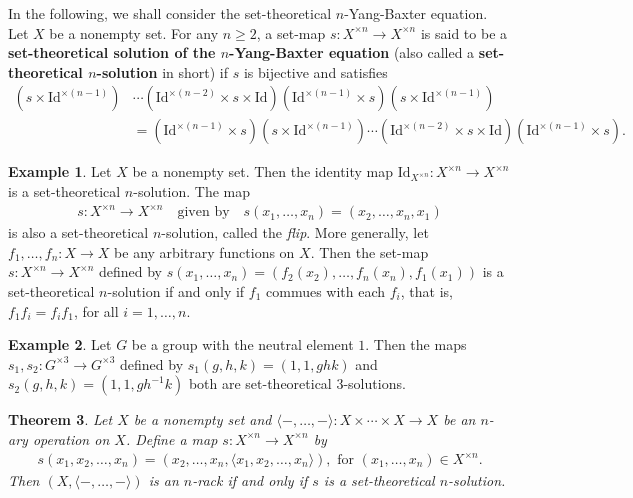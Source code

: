 \documentclass[a4paper,reqno,10pt]{amsart}
\theoremstyle{plain}
\newtheorem{thm}{Theorem}[section]
\theoremstyle{definition}
\newtheorem{exam}[thm]{Example}
\theoremstyle{remark}
\begin{document}
\medskip



In the following, we shall consider the set-theoretical $n$-Yang-Baxter equation. Let $X$ be a nonempty set. For any $n \geq 2$, a set-map $s : X^{\times n} \rightarrow X^{\times n}$ is said to be a {\bf set-theoretical solution of the $n$-Yang-Baxter equation} (also called a {\bf set-theoretical $n$-solution} in short) if $s$ is bijective and satisfies
\begin{align}\label{set-nybe}
     (s \times \mathrm{Id}^{\times (n-1)} )& \cdots (  \mathrm{Id}^{\times (n-2)} \times s \times \mathrm{Id} ) (\mathrm{Id}^{\times (n-1)} \times s) (s \times \mathrm{Id}^{\times (n-1)}) \\
     &= (\mathrm{Id}^{\times (n-1)} \times s) (s \times \mathrm{Id}^{\times (n-1)}) \cdots (\mathrm{Id}^{\times (n-2)} \times s \times \mathrm{Id}) ( \mathrm{Id}^{\times (n-1)} \times s). \nonumber
\end{align}

\begin{exam}
    Let $X$ be a nonempty set. Then the identity map $\mathrm{Id}_{X^{\times n}} : X^{\times n} \rightarrow X^{\times n}$ is a set-theoretical $n$-solution. The map
    \begin{align*}
        s : X^{\times n} \rightarrow X^{\times n} ~~~ \text{ given by }  ~~~ s (x_1, \ldots, x_n) = (x_2, \ldots, x_n, x_1)
    \end{align*}
    is also a set-theoretical $n$-solution, called the {\em flip}. More generally, let $f_1, \ldots, f_n : X \rightarrow X$ be any arbitrary functions on $X$. Then the set-map $s : X^{\times n} \rightarrow X^{\times n}$ defined by $s(x_1, \ldots, x_n) = ( f_2 (x_2), \ldots, f_n (x_n), f_1 (x_1))$ is a set-theoretical $n$-solution if and only if $f_1$ commues with each $f_i$, that is, $f_1 f_i = f_i f_1$, for all $i =1, \ldots , n$.
\end{exam}

\begin{exam}
    Let $G$ be a group with the neutral element $1$. Then the maps $s_1, s_2 : G^{\times 3} \rightarrow G^{\times 3}$ defined by $s_1 (g, h, k)= (1, 1, ghk)$ and $s_2 (g, h, k) = (1,1, gh^{-1} k)$ both are set-theoretical $3$-solutions.
\end{exam}




\begin{thm}\label{diag-thm}
    Let $X$ be a nonempty set and $\langle -, \ldots, - \rangle : X \times \cdots \times X \rightarrow X$ be an $n$-ary operation on $X$. Define a map $s : X^{\times n} \rightarrow X^{\times n}$ by 
    \begin{align*}
        s (x_1, x_2, \ldots, x_n ) =   (x_2, \ldots, x_n, \langle x_1, x_2, \ldots, x_n \rangle), \text{ for } (x_1, \ldots, x_n ) \in X^{\times n}.
    \end{align*}
    Then $(X, \langle -, \ldots, - \rangle)$ is an $n$-rack if and only if $s$ is a set-theoretical $n$-solution.
\end{thm}
\end{document}
